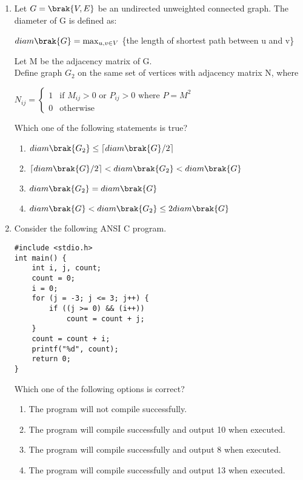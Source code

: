 \documentclass[a4paper, 11pt]{article}
\begin{document}
\begin{enumerate}
    \item Let $G=\brak{V,E}$ be an undirected unweighted connected graph. The diameter of G is defined as:
    \begin{center}
    $diam\brak{G} = \max_{u,v \in V}$ \{the length of shortest path between u and v\}
    \end{center}
    Let M be the adjacency matrix of G.\\Define graph $G_2$ on the same set of vertices with adjacency matrix N, where
    \begin{center}
    $N_{ij} = \begin{cases} 1 & \text{if } M_{ij} > 0 \text{ or } P_{ij} > 0 \text{ where } P=M^2 \\ 0 & \text{otherwise} \end{cases}$
    \end{center}
    Which one of the following statements is true?
    \begin{enumerate}
        \item $diam\brak{G_2} \le \lceil diam\brak{G}/2 \rceil$
        \item $\lceil diam\brak{G}/2 \rceil < diam\brak{G_2} < diam\brak{G}$
        \item $diam\brak{G_2} = diam\brak{G}$
        \item $diam\brak{G} < diam\brak{G_2} \le 2 diam\brak{G}$
    \end{enumerate}
    \hfill{}
    \item Consider the following ANSI C program.
    \begin{verbatim}
#include <stdio.h>
int main() {
    int i, j, count;
    count = 0;
    i = 0;
    for (j = -3; j <= 3; j++) {
        if ((j >= 0) && (i++))
            count = count + j;
    }
    count = count + i;
    printf("%d", count);
    return 0;
}
    \end{verbatim}
    Which one of the following options is correct?
    
    \begin{enumerate}
        \item The program will not compile successfully.
        \item The program will compile successfully and output 10 when executed.
        \item The program will compile successfully and output 8 when executed.
        \item The program will compile successfully and output 13 when executed.
    \end{enumerate}
    \hfill{}
    

\end{enumerate}
\end{document}
